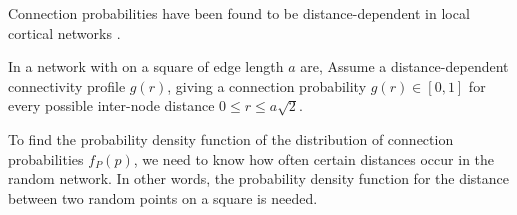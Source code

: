 
Connection probabilities have been found to be distance-dependent in local cortical networks \cite{Perin2011}.

In a network with on a square of edge length $a$ are, Assume a distance-dependent connectivity profile $g(r)$, giving a connection probability $g(r) \in [0,1]$ for every possible inter-node distance $0 \leq r \leq a \sqrt{2}$.

To find the probability density function of the distribution of connection probabilities $f_{P}(p)$, we need to know how often certain distances occur in the random network. In other words, the probability density function for the distance between two random points on a square is needed.





